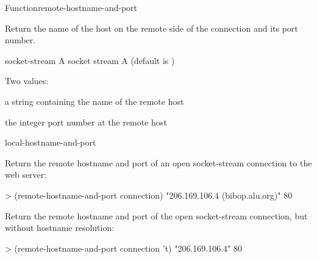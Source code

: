 \documentclass[10pt,twoside,english,pdftex]{article}
\begin{document}

\begin{functiondoc}{Function}{remote-hostname-and-port}%
  { 
      
    \mbox{\returns{} }}
%
%
%
%

\fnsyntax

\fnpurpose Return the name of the host on the remote side of the
 connection and its port number.

\fnpackage {}

\fnmodule {}

\fnargs
\begin{args}{socket-stream}
 A socket stream
 A  (default is \nil)
\end{args}

\fnreturns Two values:
\begin{tightitemize}
\item a string containing the name of the remote host
\item the integer port number at the remote host
\end{tightitemize}

\begin{alsos}{local-hostname-and-port}
\end{alsos}

\fnexamples
Return the remote hostname and port of an open socket-stream
connection to the  web server:
%
\W\supp
\begin{example}
> (remote-hostname-and-port connection)
"206.169.106.4 (bibop.alu.org)"
80
\end{example}
%
Return the remote hostname and port of the open socket-stream
connection, but without hostname resolution:
%
\W\supp\notpretop
\begin{example}
> (remote-hostname-and-port connection 't)
"206.169.106.4"
80
\end{example}

\end{functiondoc}

\end{document}
